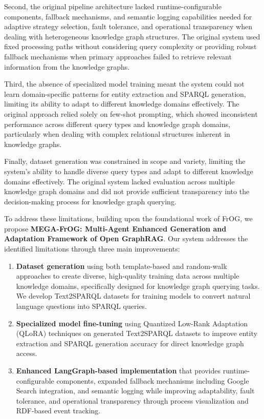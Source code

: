 Second, the original pipeline architecture lacked runtime-configurable components, fallback mechanisms, and semantic logging capabilities needed for adaptive strategy selection, fault tolerance, and operational transparency when dealing with heterogeneous knowledge graph structures. The original system used fixed processing paths without considering query complexity or providing robust fallback mechanisms when primary approaches failed to retrieve relevant information from the knowledge graphs.

Third, the absence of specialized model training meant the system could not learn domain-specific patterns for entity extraction and SPARQL generation, limiting its ability to adapt to different knowledge domains effectively. The original approach relied solely on few-shot prompting, which showed inconsistent performance across different query types and knowledge graph domains, particularly when dealing with complex relational structures inherent in knowledge graphs.

Finally, dataset generation was constrained in scope and variety, limiting the system's ability to handle diverse query types and adapt to different knowledge domains effectively. The original system lacked evaluation across multiple knowledge graph domains and did not provide sufficient transparency into the decision-making process for knowledge graph querying.

To address these limitations, building upon the foundational work of FrOG, we propose \textbf{MEGA-FrOG: Multi-Agent Enhanced Generation and Adaptation Framework of Open GraphRAG}. Our system addresses the identified limitations through three main improvements:

\begin{enumerate}
    \item \textbf{Dataset generation} using both template-based and random-walk approaches to create diverse, high-quality training data across multiple knowledge domains, specifically designed for knowledge graph querying tasks. We develop Text2SPARQL datasets \citep{text2sparql} for training models to convert natural language questions into SPARQL queries.
    
    \item \textbf{Specialized model fine-tuning} using Quantized Low-Rank Adaptation (QLoRA) techniques \citep{dettmers2023qlora} on generated Text2SPARQL datasets to improve entity extraction and SPARQL generation accuracy for direct knowledge graph access.
    
    \item \textbf{Enhanced LangGraph-based implementation} that provides runtime-configurable components, expanded fallback mechanisms including Google Search integration, and semantic logging while improving adaptability, fault tolerance, and operational transparency through process visualization and RDF-based event tracking.
\end{enumerate}

